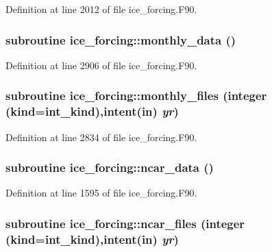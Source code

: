 Definition at line 2012 of file ice\_\-forcing.F90.\hypertarget{namespaceice__forcing_aa45c8ecbe140ec4fa53e278301462374}{
\subsubsection[{monthly\_\-data}]{\setlength{\rightskip}{0pt plus 5cm}subroutine ice\_\-forcing::monthly\_\-data ()}}
\label{namespaceice__forcing_aa45c8ecbe140ec4fa53e278301462374}


Definition at line 2906 of file ice\_\-forcing.F90.\hypertarget{namespaceice__forcing_a7a1e37c4eee269322492ab28f1e99737}{
\subsubsection[{monthly\_\-files}]{\setlength{\rightskip}{0pt plus 5cm}subroutine ice\_\-forcing::monthly\_\-files (integer (kind=int\_\-kind),intent(in) {\em yr})}}
\label{namespaceice__forcing_a7a1e37c4eee269322492ab28f1e99737}


Definition at line 2834 of file ice\_\-forcing.F90.\hypertarget{namespaceice__forcing_a24793c87569906af2dce6abb1be1f204}{
\subsubsection[{ncar\_\-data}]{\setlength{\rightskip}{0pt plus 5cm}subroutine ice\_\-forcing::ncar\_\-data ()}}
\label{namespaceice__forcing_a24793c87569906af2dce6abb1be1f204}


Definition at line 1595 of file ice\_\-forcing.F90.\hypertarget{namespaceice__forcing_a18335b8937585695c3ddddd162b39414}{
\subsubsection[{ncar\_\-files}]{\setlength{\rightskip}{0pt plus 5cm}subroutine ice\_\-forcing::ncar\_\-files (integer (kind=int\_\-kind),intent(in) {\em yr})}}
\label{namespaceice__forcing_a18335b8937585695c3ddddd162b39414}


